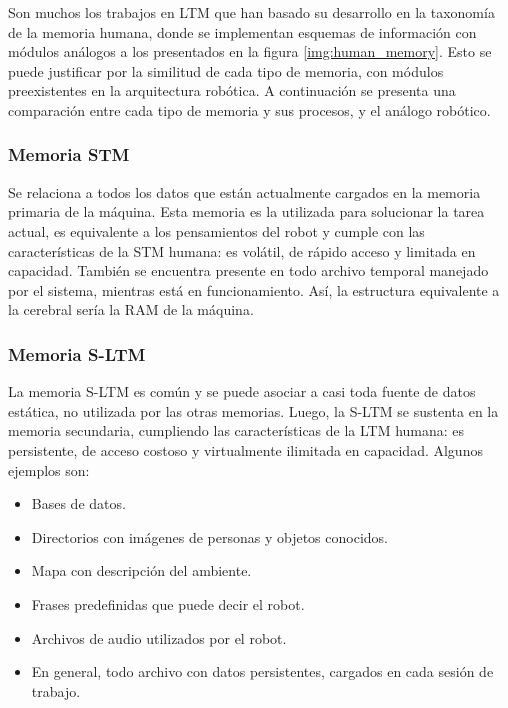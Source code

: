 Son muchos los trabajos en LTM que han basado su desarrollo en la taxonom\'ia de la memoria humana, donde se implementan esquemas de informaci\'on con m\'odulos an\'alogos a los presentados en la figura \ref{img:human_memory}. Esto se puede justificar por la similitud de cada tipo de memoria, con m\'odulos preexistentes en la arquitectura rob\'otica. A continuaci\'on se presenta una comparaci\'on entre cada tipo de memoria y sus procesos, y el an\'alogo rob\'otico.

\subsubsection{Memoria STM}

Se relaciona a todos los datos que est\'an actualmente cargados en la memoria primaria de la m\'aquina. Esta memoria es la utilizada para solucionar la tarea actual, es equivalente a los pensamientos del robot y cumple con las caracter\'isticas de la STM humana: es volátil, de r\'apido acceso y limitada en capacidad. Tambi\'en se encuentra presente en todo archivo temporal manejado por el sistema, mientras est\'a en funcionamiento. As\'i, la estructura equivalente a la cerebral ser\'ia la RAM de la m\'aquina.


\subsubsection{Memoria S-LTM}

La memoria S-LTM es com\'un y se puede asociar a casi toda fuente de datos est\'atica, no utilizada por las otras memorias. Luego, la S-LTM se sustenta en la memoria secundaria, cumpliendo las caracter\'isticas de la LTM humana: es persistente, de acceso costoso y virtualmente ilimitada en capacidad. Algunos ejemplos son:
\begin{itemize}[topsep=0pt]
\setlength\itemsep{0.2em}
\item Bases de datos.
\item Directorios con im\'agenes de personas y objetos conocidos.
\item Mapa con descripci\'on del ambiente.
\item Frases predefinidas que puede decir el robot.
\item Archivos de audio utilizados por el robot.
\item En general, todo archivo con datos persistentes, cargados en cada sesi\'on de trabajo.
\end{itemize}


